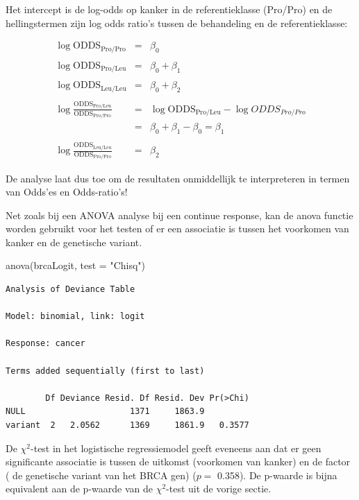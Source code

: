 \documentclass[
  dutch,
  letterpaper,
  12pt]{book}
\newenvironment{Shaded}{\begin{snugshade}}{\end{snugshade}}
\newcommand{\AttributeTok}[1]{\textcolor[rgb]{0.40,0.45,0.13}{#1}}
\newcommand{\FunctionTok}[1]{\textcolor[rgb]{0.28,0.35,0.67}{#1}}
\newcommand{\NormalTok}[1]{\textcolor[rgb]{0.00,0.23,0.31}{#1}}
\newcommand{\StringTok}[1]{\textcolor[rgb]{0.13,0.47,0.30}{#1}}
\theoremstyle{definition}
\theoremstyle{definition}
\theoremstyle{definition}
\theoremstyle{remark}
\begin{document}
Het intercept is de log-odds op kanker in de referentieklasse (Pro/Pro)
en de hellingstermen zijn log odds ratio's tussen de behandeling en de
referentieklasse:

\begin{eqnarray*}
\log \text{ODDS}_\text{Pro/Pro}&=&\beta_0\\\\
\log \text{ODDS}_\text{Pro/Leu}&=&\beta_0+\beta_1\\\\
\log \text{ODDS}_\text{Leu/Leu}&=&\beta_0+\beta_2\\\\
\log  \frac{\text{ODDS}_\text{Pro/Leu}}{\text{ODDS}_\text{Pro/Pro}}&=&\log \text{ODDS}_\text{Pro/Leu}-\log ODDS_{Pro/Pro}\\
&=&\beta_0+\beta_1-\beta_0=\beta_1\\\\
\log  \frac{\text{ODDS}_\text{Leu/Leu}}{\text{ODDS}_\text{Pro/Pro}}&=&\beta_2
\end{eqnarray*}

De analyse laat dus toe om de resultaten onmiddellijk te interpreteren
in termen van Odds'es en Odds-ratio's!

Net zoals bij een ANOVA analyse bij een continue response, kan de anova
functie worden gebruikt voor het testen of er een associatie is tussen
het voorkomen van kanker en de genetische variant.

\begin{Shaded}
\begin{Highlighting}[]
\FunctionTok{anova}\NormalTok{(brcaLogit, }\AttributeTok{test =} \StringTok{"Chisq"}\NormalTok{)}
\end{Highlighting}
\end{Shaded}

\begin{verbatim}
Analysis of Deviance Table

Model: binomial, link: logit

Response: cancer

Terms added sequentially (first to last)

        Df Deviance Resid. Df Resid. Dev Pr(>Chi)
NULL                     1371     1863.9         
variant  2   2.0562      1369     1861.9   0.3577
\end{verbatim}

De \(\chi^2\)-test in het logistische regressiemodel geeft eveneens aan
dat er geen significante associatie is tussen de uitkomst (voorkomen van
kanker) en de factor ( de genetische variant van het BRCA gen) (\(p=\)
0.358). De p-waarde is bijna equivalent aan de p-waarde van de
\(\chi^2\)-test uit de vorige sectie.
\end{document}
